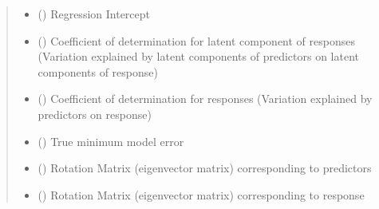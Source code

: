 \documentclass[letterpaper,10pt,english]{sphinxmanual}
\begin{document}
\begin{fulllineitems}
\begin{quote}
\begin{description}
\begin{itemize}
\item {} 
 () \textendash{} Regression Intercept

\item {} 
 () \textendash{} Coefficient of determination for latent component of responses (Variation explained by latent components of predictors on latent components of response)

\item {} 
 () \textendash{} Coefficient of determination for responses (Variation explained by predictors on response)

\item {} 
 () \textendash{} True minimum model error

\item {} 
 () \textendash{} Rotation Matrix (eigenvector matrix) corresponding to predictors

\item {} 
 () \textendash{} Rotation Matrix (eigenvector matrix) corresponding to response

\end{itemize}

\end{description}\end{quote}

\end{fulllineitems}


\begin{fulllineitems}
\label{\detokenize{Classes:pysimrel.Data}}
\end{fulllineitems}
\end{document}
